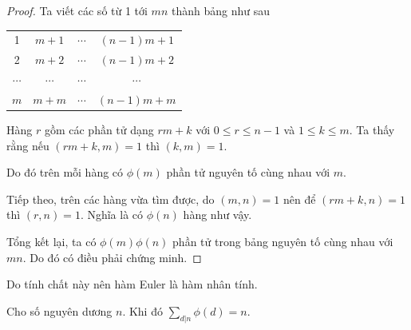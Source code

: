 \documentclass{mynotes}
\begin{document}
\begin{proof}
    Ta viết các số từ 1 tới $mn$ thành bảng như sau

    \begin{table}
        \centering
        \begin{tabular}{c c c c}
            1 & $m+1$ & $\cdots$ & $(n-1)m + 1$ \\
            2 & $m+2$ & $\cdots$ & $(n-1)m + 2$ \\
            $\cdots$ & $\cdots$ & $\cdots$ & $\cdots$ \\
            $m$ & $m+m$ & $\cdots$ & $(n-1)m + m$
        \end{tabular}
    \end{table}
    
    Hàng $r$ gồm các phần tử dạng $r m + k$ với $0 \leqslant r \leqslant n-1$ và $1 \leqslant k \leqslant m$.  Ta thấy rằng nếu $(rm + k, m) = 1$ thì $(k, m) = 1$.

    Do đó trên mỗi hàng có $\phi(m)$ phần tử nguyên tố cùng nhau với $m$.

    Tiếp theo, trên các hàng vừa tìm được, do $(m, n) = 1$ nên để $(rm + k, n) = 1$ thì $(r, n) = 1$. Nghĩa là có $\phi(n)$ hàng như vậy.

    Tổng kết lại, ta có $\phi(m) \phi(n)$ phần tử trong bảng nguyên tố cùng nhau với $mn$. Do đó có điều phải chứng minh.
\end{proof}

Do tính chất này nên hàm Euler là hàm nhân tính.

\begin{remark}
    Cho số nguyên dương $n$. Khi đó $\displaystyle{\sum_{d | n} \phi(d) = n}$.
\end{remark}
\end{document}
